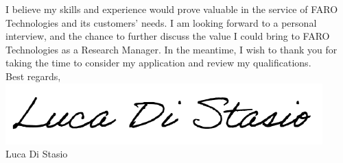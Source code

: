 \documentclass[
  a4paper, 
]{fortysecondscv}
\def\position{Research Manager}
\def\company{FARO Technologies}
\begin{document}
I believe my skills and experience would prove valuable in the service of {\company} and its customers' needs. I am looking forward to a personal interview, and the chance to further discuss the value I could bring to {\company} as a \position. In the meantime, I wish to thank you for taking the time to consider my application and review my
qualifications.\\[12pt]
Best regards,\\
\includegraphics[scale=0.75]{Signature.png}\\
Luca Di Stasio
\end{document}
